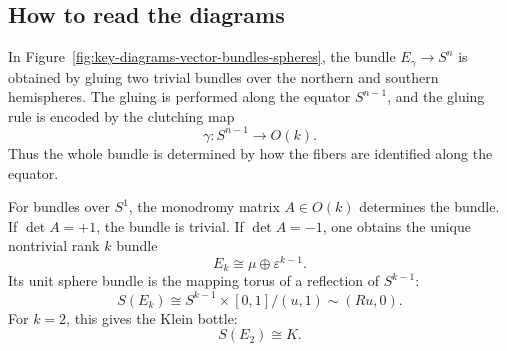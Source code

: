 \documentclass[12pt,a4paper]{article}
\theoremstyle{notespace}
\begin{document}
\subsection*{How to read the diagrams}

In Figure~\ref{fig:key-diagrams-vector-bundles-spheres}, the bundle \(E_\gamma\to S^n\) is obtained by gluing two trivial bundles over the northern and southern hemispheres. The gluing is performed along the equator \(S^{n-1}\), and the gluing rule is encoded by the clutching map
\[
\gamma:S^{n-1}\longrightarrow O(k).
\]
Thus the whole bundle is determined by how the fibers are identified along the equator.

For bundles over \(S^1\), the monodromy matrix \(A\in O(k)\) determines the bundle. If \(\det A=+1\), the bundle is trivial. If \(\det A=-1\), one obtains the unique nontrivial rank \(k\) bundle
\[
E_k\cong \mu\oplus \varepsilon^{k-1}.
\]
Its unit sphere bundle is the mapping torus of a reflection of \(S^{k-1}\):
\[
S(E_k)
\cong
S^{k-1}\times[0,1]/(u,1)\sim(Ru,0).
\]
For \(k=2\), this gives the Klein bottle:
\[
S(E_2)\cong K.
\]
	
\end{document}
